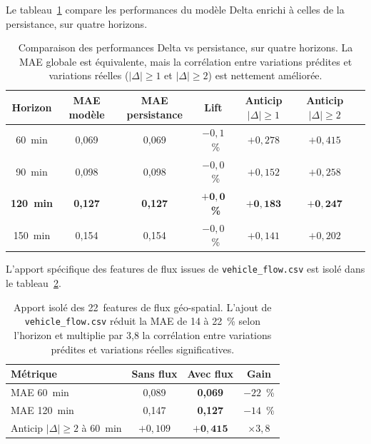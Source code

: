 \documentclass[fleqn, 12pt]{scrartcl}
\begin{document}
Le tableau~\ref{tab:resultats} compare les performances du modèle Delta enrichi à celles de la persistance, sur quatre horizons.

\begin{table}[htp]
\centering
\small
\begin{tabular}{ccccccc}
\hline
\textbf{Horizon} & \textbf{MAE modèle} & \textbf{MAE persistance} & \textbf{Lift} & \textbf{Anticip $|\Delta| \geq 1$} & \textbf{Anticip $|\Delta| \geq 2$} \\
\hline
60~min  & 0{,}069 & 0{,}069 & $-0{,}1$~\% & $+0{,}278$ & $+0{,}415$ \\
90~min  & 0{,}098 & 0{,}098 & $-0{,}0$~\% & $+0{,}152$ & $+0{,}258$ \\
\textbf{120~min} & \textbf{0{,}127} & \textbf{0{,}127} & $+\mathbf{0{,}0}$~\textbf{\%} & $\mathbf{+0{,}183}$ & $\mathbf{+0{,}247}$ \\
150~min & 0{,}154 & 0{,}154 & $-0{,}0$~\% & $+0{,}141$ & $+0{,}202$ \\
\hline
\end{tabular}
\caption{Comparaison des performances Delta vs persistance, sur quatre horizons. La MAE globale est équivalente, mais la corrélation entre variations prédites et variations réelles ($|\Delta| \geq 1$ et $|\Delta| \geq 2$) est nettement améliorée.}
\label{tab:resultats}
\end{table}

L'apport spécifique des features de flux issues de \texttt{vehicle\_flow.csv} est isolé dans le tableau~\ref{tab:flux}.

\begin{table}[htp]
\centering
\small
\begin{tabular}{lccc}
\hline
\textbf{Métrique} & \textbf{Sans flux} & \textbf{Avec flux} & \textbf{Gain} \\
\hline
MAE 60~min & 0{,}089 & \textbf{0{,}069} & $-22$~\% \\
MAE 120~min & 0{,}147 & \textbf{0{,}127} & $-14$~\% \\
Anticip $|\Delta| \geq 2$ à 60~min & $+0{,}109$ & $\mathbf{+0{,}415}$ & $\times 3{,}8$ \\
\hline
\end{tabular}
\caption{Apport isolé des 22~features de flux géo-spatial. L'ajout de \texttt{vehicle\_flow.csv} réduit la MAE de 14 à 22~\% selon l'horizon et multiplie par 3{,}8 la corrélation entre variations prédites et variations réelles significatives.}
\label{tab:flux}
\end{table}
\end{document}
